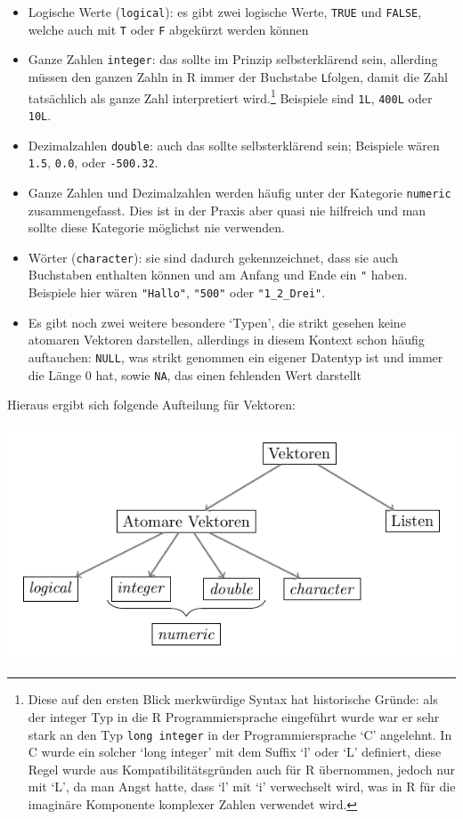 \documentclass[]{book}
\providecommand{\tightlist}{%
  \setlength{\itemsep}{0pt}\setlength{\parskip}{0pt}}
\let\rmarkdownfootnote\footnote%
\def\footnote{\protect\rmarkdownfootnote}
\begin{document}
\begin{itemize}
\tightlist
\item
  Logische Werte (\texttt{logical}): es gibt zwei logische Werte,
  \texttt{TRUE} und \texttt{FALSE}, welche auch mit \texttt{T} oder
  \texttt{F} abgekürzt werden können
\item
  Ganze Zahlen \texttt{integer}: das sollte im Prinzip selbsterklärend
  sein, allerding müssen den ganzen Zahln in R immer der Buchstabe
  \texttt{L}folgen, damit die Zahl tatsächlich als ganze Zahl
  interpretiert wird.\footnote{Diese auf den ersten Blick merkwürdige
    Syntax hat historische Gründe: als der integer Typ in die R
    Programmiersprache eingeführt wurde war er sehr stark an den Typ
    \texttt{long\ integer} in der Programmiersprache `C' angelehnt. In C
    wurde ein solcher `long integer' mit dem Suffix `l' oder `L'
    definiert, diese Regel wurde aus Kompatibilitätsgründen auch für R
    übernommen, jedoch nur mit `L', da man Angst hatte, dass `l' mit `i'
    verwechselt wird, was in R für die imaginäre Komponente komplexer
    Zahlen verwendet wird.} Beispiele sind \texttt{1L}, \texttt{400L}
  oder \texttt{10L}.\\
\item
  Dezimalzahlen \texttt{double}: auch das sollte selbsterklärend sein;
  Beispiele wären \texttt{1.5}, \texttt{0.0}, oder \texttt{-500.32}.
\item
  Ganze Zahlen und Dezimalzahlen werden häufig unter der Kategorie
  \texttt{numeric} zusammengefasst. Dies ist in der Praxis aber quasi
  nie hilfreich und man sollte diese Kategorie möglichst nie verwenden.
\item
  Wörter (\texttt{character}): sie sind dadurch gekennzeichnet, dass sie
  auch Buchstaben enthalten können und am Anfang und Ende ein \texttt{"}
  haben. Beispiele hier wären \texttt{"Hallo"}, \texttt{"500"} oder
  \texttt{"1\_2\_Drei"}.
\item
  Es gibt noch zwei weitere besondere `Typen', die strikt gesehen keine
  atomaren Vektoren darstellen, allerdings in diesem Kontext schon
  häufig auftauchen: \texttt{NULL}, was strikt genommen ein eigener
  Datentyp ist und immer die Länge 0 hat, sowie \texttt{NA}, das einen
  fehlenden Wert darstellt
\end{itemize}

Hieraus ergibt sich folgende Aufteilung für Vektoren:

\begin{center}\includegraphics[width=0.8\linewidth]{figures/vector-classification} \end{center}
\end{document}
